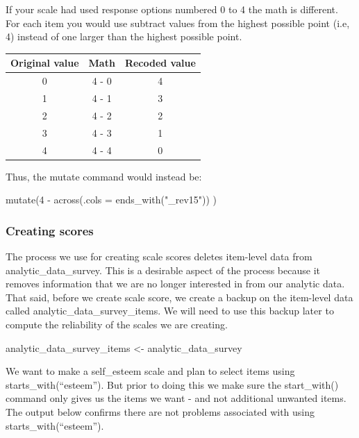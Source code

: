 \documentclass[
]{krantz}
\makeatletter
\newenvironment{Shaded}{\begin{snugshade}}{\end{snugshade}}
\newcommand{\NormalTok}[1]{#1}
\newcommand{\StringTok}[1]{\textcolor[rgb]{0.5,0.5,0.5}{#1}}
\newenvironment{kframe}{%
\medskip{}
\setlength{\fboxsep}{.8em}
 \def\at@end@of@kframe{}%
 \ifinner\ifhmode%
  \def\at@end@of@kframe{\end{minipage}}%
  \begin{minipage}{\columnwidth}%
 \fi\fi%
 \def\FrameCommand##1{\hskip\@totalleftmargin \hskip-\fboxsep
 \colorbox{shadecolor}{##1}\hskip-\fboxsep
     \hskip-\linewidth \hskip-\@totalleftmargin \hskip\columnwidth}%
 \MakeFramed {\advance\hsize-\width
   \@totalleftmargin\z@ \linewidth\hsize
   \@setminipage}}%
 {\par\unskip\endMakeFramed%
 \at@end@of@kframe}
\newenvironment{rmdblock}[1]
  {
  \begin{itemize}
  \renewcommand{\labelitemi}{
    \raisebox{-.7\height}[0pt][0pt]{
      {\setkeys{Gin}{width=3em,keepaspectratio}\texttt{[image: images/\#1]}}
    }
  }
  \setlength{\fboxsep}{1em}
  \begin{kframe}
  \item
  }
  {
  \end{kframe}
  \end{itemize}
  }
\newenvironment{rmdcaution}
  {\begin{rmdblock}{caution}}
  {\end{rmdblock}}
\renewenvironment{Shaded}{\begin{kframe}}{\end{kframe}}
\makeatother
\begin{document}
\begin{rmdcaution}
\begin{rmdcaution}

If your scale had used response options numbered 0 to 4 the math is different.
For each item you would use subtract values from the highest possible point (i.e, 4) instead of one larger than the highest possible point.

\begin{longtable}[]{@{}ccc@{}}
\toprule
Original value & Math & Recoded value\tabularnewline
\midrule
\endhead
0 & 4 - 0 & 4\tabularnewline
1 & 4 - 1 & 3\tabularnewline
2 & 4 - 2 & 2\tabularnewline
3 & 4 - 3 & 1\tabularnewline
4 & 4 - 4 & 0\tabularnewline
\bottomrule
\end{longtable}

Thus, the mutate command would instead be:

mutate(4 - across(.cols = ends\_with("\_rev15")) )

\end{rmdcaution}
\end{rmdcaution}

\hypertarget{creating-scores}{%
\subsubsection{Creating scores}\label{creating-scores}}

The process we use for creating scale scores deletes item-level data from analytic\_data\_survey. This is a desirable aspect of the process because it removes information that we are no longer interested in from our analytic data. That said, before we create scale score, we create a backup on the item-level data called analytic\_data\_survey\_items. We will need to use this backup later to compute the reliability of the scales we are creating.

\begin{Shaded}
\begin{Highlighting}[]
\NormalTok{analytic_data_survey_items <-}\StringTok{ }\NormalTok{analytic_data_survey}
\end{Highlighting}
\end{Shaded}

We want to make a self\_esteem scale and plan to select items using starts\_with(``esteem''). But prior to doing this we make sure the start\_with() command only gives us the items we want - and not additional unwanted items. The output below confirms there are not problems associated with using starts\_with(``esteem'').
\end{document}
